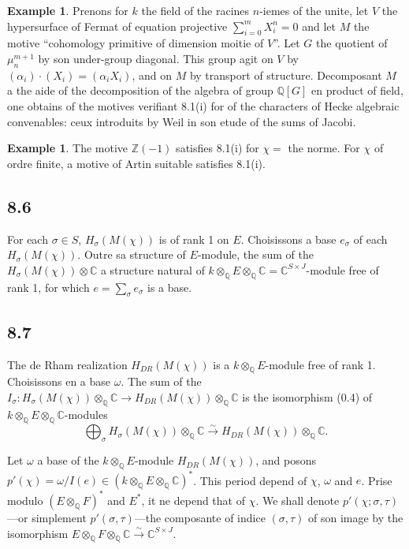 \documentclass[12pt,a4paper]{article}
\theoremstyle{plain}
\theoremstyle{definition}
\newtheorem{example}[definition]{Example}
\theoremstyle{remark}
\newcommand{\Q}{\mathbb{Q}}
\newcommand{\C}{\mathbb{C}}
\newcommand{\Z}{\mathbb{Z}}
\begin{document}
\begin{example}
Prenons for $k$ the field of the racines $n$-iemes of the unite, let $V$ the hypersurface
of Fermat of equation projective $\sum_{i=0}^{m} X_i^n = 0$ and let $M$ the motive ``cohomology
primitive of dimension moitie of $V$''. Let $G$ the quotient of $\mu_n^{m+1}$ by son
under-group diagonal. This group agit on $V$ by $(\alpha_i) \cdot (X_i) = (\alpha_i X_i)$, and
on $M$ by transport of structure. Decomposant $M$ a the aide of the decomposition of
the algebra of group $\Q[G]$ en product of field, one obtains of the motives verifiant 8.1(i)
for of the characters of Hecke algebraic convenables: ceux introduits by Weil in
son etude of the sums of Jacobi.
\end{example}

\begin{example}
The motive $\Z(-1)$ satisfies 8.1(i) for $\chi =$ the norme. For $\chi$ of ordre finite, a motive
of Artin suitable satisfies 8.1(i).
\end{example}

\subsection*{8.6}

For each $\sigma \in S$, $H_\sigma(M(\chi))$ is of rank 1 on $E$. Choisissons a base $e_\sigma$
of each $H_\sigma(M(\chi))$. Outre sa structure of $E$-module, the sum of the
$H_\sigma(M(\chi)) \otimes \C$ a structure natural of $k \otimes_\Q E \otimes_\Q \C = \C^{S \times J}$-module
free of rank 1, for which $e = \sum_\sigma e_\sigma$ is a base.

\subsection*{8.7}

The de Rham realization $H_{DR}(M(\chi))$ is a $k \otimes_\Q E$-module free of rank 1.
Choisissons en a base $\omega$. The sum of the $I_\sigma: H_\sigma(M(\chi)) \otimes_\Q \C \to
H_{DR}(M(\chi)) \otimes_\Q \C$ is the isomorphism (0.4) of $k \otimes_\Q E \otimes_\Q \C$-modules
\[
\bigoplus_\sigma H_\sigma(M(\chi)) \otimes_\Q \C \xrightarrow{\sim} H_{DR}(M(\chi)) \otimes_\Q \C.
\]

Let $\omega$ a base of the $k \otimes_\Q E$-module $H_{DR}(M(\chi))$, and posons
$p'(\chi) = \omega/I(e) \in (k \otimes_\Q E \otimes_\Q \C)^*$. This period depend of $\chi$, $\omega$ and $e$.
Prise modulo $(E \otimes_\Q F)^*$ and $E^*$, it ne depend that of $\chi$. We shall denote
$p'(\chi; \sigma, \tau)$---or simplement $p'(\sigma, \tau)$---the composante of indice $(\sigma, \tau)$ of
son image by the isomorphism $E \otimes_\Q F \otimes_\Q \C \xrightarrow{\sim} \C^{S \times J}$.
\end{document}

